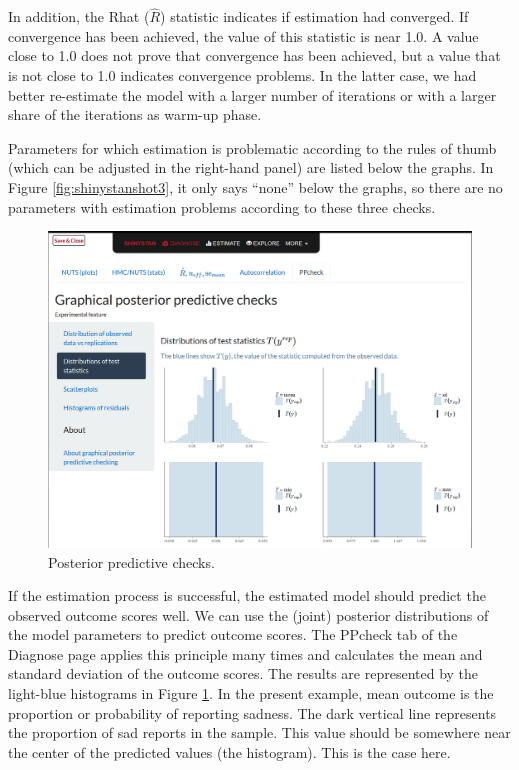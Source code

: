 \documentclass[doc]{apa6}
\begin{document}
In addition, the Rhat (\(\hat{R}\)) statistic indicates if estimation
had converged. If convergence has been achieved, the value of this
statistic is near 1.0. A value close to 1.0 does not prove that
convergence has been achieved, but a value that is not close to 1.0
indicates convergence problems. In the latter case, we had better
re-estimate the model with a larger number of iterations or with a
larger share of the iterations as warm-up phase.

Parameters for which estimation is problematic according to the rules of
thumb (which can be adjusted in the right-hand panel) are listed below
the graphs. In Figure \ref{fig:shinystanshot3}, it only says
\enquote{none} below the graphs, so there are no parameters with
estimation problems according to these three checks.

\begin{figure}[H]
\includegraphics[width=1\linewidth]{shinystan4} \caption{Posterior predictive checks.}\label{fig:shinystanshot4}
\end{figure}

If the estimation process is successful, the estimated model should
predict the observed outcome scores well. We can use the (joint)
posterior distributions of the model parameters to predict outcome
scores. The PPcheck tab of the Diagnose page applies this principle many
times and calculates the mean and standard deviation of the outcome
scores. The results are represented by the light-blue histograms in
Figure \ref{fig:shinystanshot4}. In the present example, mean outcome is
the proportion or probability of reporting sadness. The dark vertical
line represents the proportion of sad reports in the sample. This value
should be somewhere near the center of the predicted values (the
histogram). This is the case here.
\end{document}

